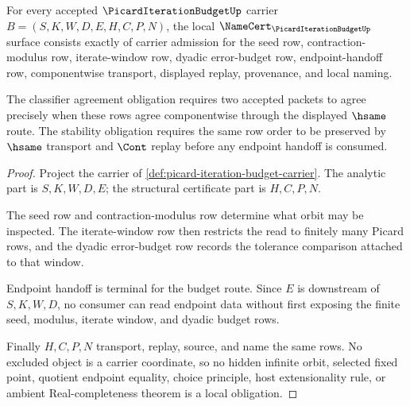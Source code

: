\begin{theorem}
\label{thm:picard-iteration-budget-namecert-obligations}
For every accepted $\PicardIterationBudgetUp$ carrier $B=(S,K,W,D,E,H,C,P,N)$, the local $\NameCert_{\PicardIterationBudgetUp}$ surface consists exactly of carrier admission for the seed row, contraction-modulus row, iterate-window row, dyadic error-budget row, endpoint-handoff row, componentwise transport, displayed replay, provenance, and local naming.

The classifier agreement obligation requires two accepted packets to agree precisely when these rows agree componentwise through the displayed $\hsame$ route. The stability obligation requires the same row order to be preserved by $\hsame$ transport and $\Cont$ replay before any endpoint handoff is consumed.
\end{theorem}
\begin{proof}
Project the carrier of \autoref{def:picard-iteration-budget-carrier}. The analytic part is $S,K,W,D,E$; the structural certificate part is $H,C,P,N$.

The seed row and contraction-modulus row determine what orbit may be inspected. The iterate-window row then restricts the read to finitely many Picard rows, and the dyadic error-budget row records the tolerance comparison attached to that window.

Endpoint handoff is terminal for the budget route. Since $E$ is downstream of $S,K,W,D$, no consumer can read endpoint data without first exposing the finite seed, modulus, iterate window, and dyadic budget rows.

Finally $H,C,P,N$ transport, replay, source, and name the same rows. No excluded object is a carrier coordinate, so no hidden infinite orbit, selected fixed point, quotient endpoint equality, choice principle, host extensionality rule, or ambient Real-completeness theorem is a local obligation.
\end{proof}

